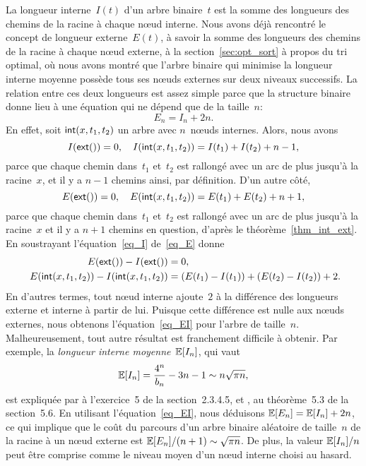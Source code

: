 La longueur interne~\(I(t)\)
d'un arbre binaire~\(t\) est la somme des longueurs des chemins de la
racine à chaque n{\oe}ud interne. Nous avons déjà rencontré le concept
de longueur externe~\(E(t)\), à
savoir la somme des longueurs des chemins de la racine à chaque
n{\oe}ud externe, à la section~\vref{sec:opt_sort} à propos du tri
optimal, où nous avons montré que l'arbre binaire qui minimise la
longueur interne moyenne possède tous ses n{\oe}uds externes sur deux
niveaux successifs. La relation entre ces deux longueurs est assez
simple parce que la structure binaire donne lieu à une équation qui ne
dépend que de la taille~\(n\):
\begin{equation}
E_n = I_n + 2n.\label{eq_EI}
\end{equation}
En effet, soit \(\textsf{int}(x,t_1,t_2)\) un arbre avec \(n\)~n{\oe}uds
internes. Alors, nous avons
\begin{equation}
  I(\textsf{ext}()) = 0,\quad
  I(\textsf{int}(x,t_1,t_2)) = I(t_1) + I(t_2) + n - 1,
\label{eq_I}
\end{equation}
parce que chaque chemin dans~\(t_1\) et~\(t_2\) est rallongé avec un
arc de plus jusqu'à la racine~\(x\), et il y a \(n-1\) chemins ainsi,
par définition. D'un autre côté,
\begin{equation}
  E(\textsf{ext}()) = 0,\quad
  E(\textsf{int}(x,t_1,t_2)) = E(t_1) + E(t_2) + n + 1,
\label{eq_E}
\end{equation}
parce que chaque chemin dans~\(t_1\) et~\(t_2\) est rallongé avec un
arc de plus jusqu'à la racine~\(x\) et il y a \(n+1\) chemins en
question, d'après le théorème~\vref{thm_int_ext}. En soustrayant
l'équation~\eqref{eq_I} de~\eqref{eq_E} donne
\begin{align*}
  E(\textsf{ext}()) - I(\textsf{ext}()) &= 0,\\
  E(\textsf{int}(x,t_1,t_2)) - I(\textsf{int}(x,t_1,t_2))
  &= (E(t_1) - I(t_1)) + (E(t_2) - I(t_2)) + 2.\!\!
\end{align*}
En d'autres termes, tout n{\oe}ud interne ajoute~\(2\) à la différence
des longueurs externe et interne à partir de lui. Puisque cette
différence est nulle aux n{\oe}uds externes, nous obtenons
l'équation~\eqref{eq_EI} pour l'arbre de taille~\(n\). Malheureusement,
tout autre résultat est franchement difficile à obtenir. Par exemple,
la \emph{longueur interne moyenne}~\(\mathbb{E}[{I_n}]\), qui vaut
\begin{equation*}
\mathbb{E}[{I_n}]  = \frac{4^n}{b_n} - 3n - 1 \sim n \sqrt{\pi n},
\end{equation*}
est expliquée par \cite{Knuth_1997} à l'exercice~5 de la
section~2.3.4.5, et \cite{SedgewickFlajolet_1996}, au théorème~5.3 de
la section~5.6.  En utilisant l'équation~\eqref{eq_EI}, nous déduisons
\(\mathbb{E}[{E_n}] = \mathbb{E}[{I_n}] + 2n\), ce qui implique que le coût
du parcours d'un arbre binaire aléatoire de taille~\(n\) de la racine
à un n{\oe}ud externe est \(\mathbb{E}[{E_n}]/(n+1) \sim \sqrt{\pi
  n}\). De plus, la valeur \(\mathbb{E}[{I_n}]/n\) peut être comprise
comme le niveau moyen d'un n{\oe}ud interne choisi au hasard.

